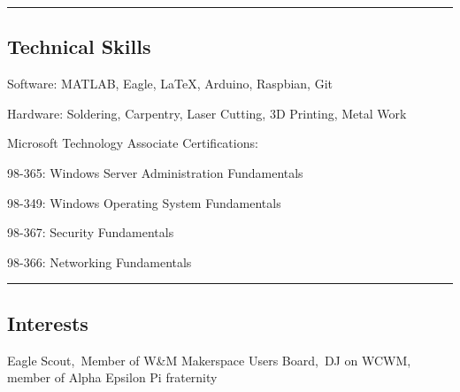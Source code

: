 \documentclass[10pt,letterpaper]{article}
\newenvironment{indentsection}[1]%
{\begin{list}{}%
	{\setlength{\leftmargin}{#1}}%
	\item[]%
}
{\end{list}}
\begin{document}
\hrule
\vspace{-0.4em}
\subsection*{Technical Skills}

\begin{indentsection}{\parindent}
\begin{description*}
	\item[Software:]
	MATLAB, Eagle, \LaTeX, Arduino, Raspbian, Git
	\item[Hardware:]
	Soldering, Carpentry, Laser Cutting, 3D Printing, Metal Work
	\item[Microsoft Technology Associate Certifications:]
	\hfill
	\begin{itemize*}
	\item 98-365: Windows Server Administration Fundamentals
	\item 98-349: Windows Operating System Fundamentals
	\item 98-367: Security Fundamentals
	\item 98-366: Networking Fundamentals
	\end{itemize*}
\end{description*}
\end{indentsection}

\hrule
\vspace{-0.4em}
\subsection*{Interests}
\indent Eagle Scout,\, Member of W\&M Makerspace Users Board,\, DJ on WCWM,\, member of Alpha Epsilon Pi fraternity
\end{document}
